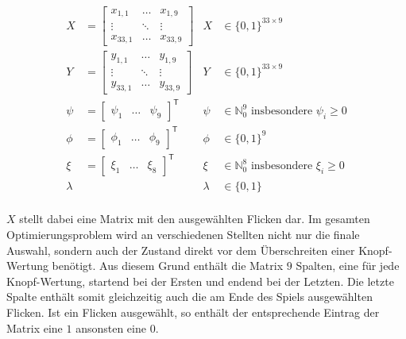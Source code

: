 \begin{align*}
    X       & = \begin{bmatrix}
                    x_{1,1}  & \dots  & x_{1,9}  \\
                    \vdots   & \ddots & \vdots   \\
                    x_{33,1} & \dots  & x_{33,9}
                \end{bmatrix} & X       & \in \{0,1\}^{33 \times 9}                                                 \\
    Y       & = \begin{bmatrix}
                    y_{1,1}  & \dots  & y_{1,9}  \\
                    \vdots   & \ddots & \vdots   \\
                    y_{33,1} & \dots  & y_{33,9}
                \end{bmatrix} & Y       & \in \{0,1\}^{33 \times 9}                                                 \\
    \psi    & = \begin{bmatrix}
                    \psi_1 & \dots & \psi_9
                \end{bmatrix}^\mathsf{T}        & \psi    & \in \mathbb{N}_0^{9} \text{ insbesondere } \psi_i \ge 0 \\
    \phi    & = \begin{bmatrix}
                    \phi_1 & \dots & \phi_9
                \end{bmatrix}^\mathsf{T}        & \phi    & \in \{0,1\}^{9}                                         \\
    \xi     & = \begin{bmatrix}
                    \xi_1 & \dots & \xi_8
                \end{bmatrix}^\mathsf{T}        & \xi     & \in \mathbb{N}_0^{8} \text{ insbesondere } \xi_i \ge 0  \\
    \lambda &                                 & \lambda & \in \{0,1\}                                               \\
\end{align*}

\vspace*{-1cm}

$X$ stellt dabei eine Matrix mit den ausgewählten Flicken dar. Im gesamten Optimierungsproblem wird an verschiedenen Stellten nicht nur die finale Auswahl, sondern auch der Zustand direkt vor dem Überschreiten einer Knopf-Wertung benötigt. Aus diesem Grund enthält die Matrix $9$ Spalten, eine für jede Knopf-Wertung, startend bei der Ersten und endend bei der Letzten. Die letzte Spalte enthält somit gleichzeitig auch die am Ende des Spiels ausgewählten Flicken. Ist ein Flicken ausgewählt, so enthält der entsprechende Eintrag der Matrix eine $1$ ansonsten eine $0$.

